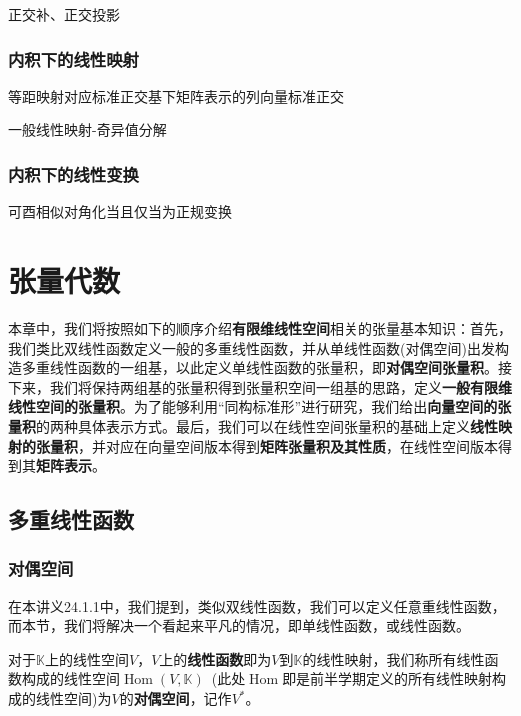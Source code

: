 \documentclass[a4paper,UTF8,fontset=windows,AutoFakeBold]{ctexart}
\DeclareMathOperator{\Hom}{Hom}
\begin{document}
正交补、正交投影

\subsubsection{内积下的线性映射}
等距映射对应标准正交基下矩阵表示的列向量标准正交

一般线性映射-奇异值分解

\subsubsection{内积下的线性变换}
可酉相似对角化当且仅当为正规变换

\section{张量代数}
本章中，我们将按照如下的顺序介绍\textbf{有限维线性空间}相关的张量基本知识：首先，我们类比双线性函数定义一般的多重线性函数，并从单线性函数(对偶空间)出发构造多重线性函数的一组基，以此定义单线性函数的张量积，即\textbf{对偶空间张量积}。接下来，我们将保持两组基的张量积得到张量积空间一组基的思路，定义\textbf{一般有限维线性空间的张量积}。为了能够利用``同构标准形''进行研究，我们给出\textbf{向量空间的张量积}的两种具体表示方式。最后，我们可以在线性空间张量积的基础上定义\textbf{线性映射的张量积}，并对应在向量空间版本得到\textbf{矩阵张量积及其性质}，在线性空间版本得到其\textbf{矩阵表示}。

\subsection{多重线性函数}
\subsubsection{对偶空间}
在本讲义24.1.1中，我们提到，类似双线性函数，我们可以定义任意重线性函数，而本节，我们将解决一个看起来平凡的情况，即单线性函数，或线性函数。

对于$\mathbb{K}$上的线性空间$V$，$V$上的\textbf{线性函数}即为$V$到$\mathbb{K}$的线性映射，我们称所有线性函数构成的线性空间$\Hom(V,\mathbb{K})$\ (此处$\Hom$即是前半学期定义的所有线性映射构成的线性空间)为$V$的\textbf{对偶空间}，记作$V^*$。
\end{document}
